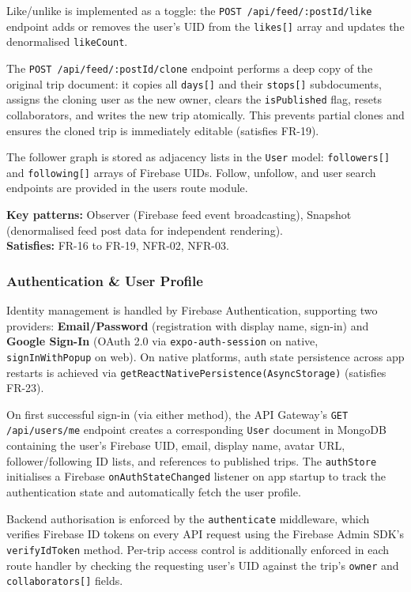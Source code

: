 \documentclass[12pt, a4paper]{article}
\begin{document}
Like/unlike is implemented as a toggle: the \texttt{POST /api/feed/:postId/like} endpoint adds or removes the user's UID from the \texttt{likes[]} array and updates the denormalised \texttt{likeCount}.

The \texttt{POST /api/feed/:postId/clone} endpoint performs a deep copy of the original trip document: it copies all \texttt{days[]} and their \texttt{stops[]} subdocuments, assigns the cloning user as the new owner, clears the \texttt{isPublished} flag, resets collaborators, and writes the new trip atomically. This prevents partial clones and ensures the cloned trip is immediately editable (satisfies FR-19).

The follower graph is stored as adjacency lists in the \texttt{User} model: \texttt{followers[]} and \texttt{following[]} arrays of Firebase UIDs. Follow, unfollow, and user search endpoints are provided in the users route module.

\begin{tcolorbox}[notebox]
  \textbf{Key patterns:} Observer (Firebase feed event broadcasting), Snapshot (denormalised feed post data for independent rendering).\\[2pt]
  \textbf{Satisfies:} FR-16 to FR-19, NFR-02, NFR-03.
\end{tcolorbox}

\subsubsection{Authentication \& User Profile}

Identity management is handled by Firebase Authentication, supporting two providers: \textbf{Email/Password} (registration with display name, sign-in) and \textbf{Google Sign-In} (OAuth 2.0 via \texttt{expo-auth-session} on native, \texttt{signInWithPopup} on web). On native platforms, auth state persistence across app restarts is achieved via \texttt{getReactNativePersistence(AsyncStorage)} (satisfies FR-23).

On first successful sign-in (via either method), the API Gateway's \texttt{GET /api/users/me} endpoint creates a corresponding \texttt{User} document in MongoDB containing the user's Firebase UID, email, display name, avatar URL, follower/following ID lists, and references to published trips. The \texttt{authStore} initialises a Firebase \texttt{onAuthStateChanged} listener on app startup to track the authentication state and automatically fetch the user profile.

Backend authorisation is enforced by the \texttt{authenticate} middleware, which verifies Firebase ID tokens on every API request using the Firebase Admin SDK's \texttt{verifyIdToken} method. Per-trip access control is additionally enforced in each route handler by checking the requesting user's UID against the trip's \texttt{owner} and \texttt{collaborators[]} fields.
\end{document}
